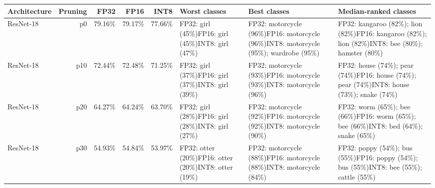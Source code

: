 \begingroup\scriptsize
\setlength{\tabcolsep}{3pt}
\begin{longtable}{p{2.8cm} r r r r p{5.0cm} p{4.2cm} p{4.2cm}}
\hline
Architecture & Pruning & FP32 & FP16 & INT8 & Worst classes & Best classes & Median-ranked classes \\
\hline\endhead
ResNet-18 & p0 & 79.16\% & 79.17\% & 77.66\% & FP32: girl (45\%)\newline FP16: girl (45\%)\newline INT8: girl (47\%) & FP32: motorcycle (96\%)\newline FP16: motorcycle (96\%)\newline INT8: motorcycle (95\%); wardrobe (95\%) & FP32: kangaroo (82\%); lion (82\%)\newline FP16: kangaroo (82\%); lion (82\%)\newline INT8: bee (80\%); hamster (80\%) \\ \hline
ResNet-18 & p10 & 72.44\% & 72.48\% & 71.25\% & FP32: girl (37\%)\newline FP16: girl (37\%)\newline INT8: girl (39\%) & FP32: motorcycle (93\%)\newline FP16: motorcycle (93\%)\newline INT8: motorcycle (96\%) & FP32: house (74\%); pear (74\%)\newline FP16: house (74\%); pear (74\%)\newline INT8: house (73\%); snake (74\%) \\ \hline
ResNet-18 & p20 & 64.27\% & 64.24\% & 63.70\% & FP32: girl (28\%)\newline FP16: girl (28\%)\newline INT8: girl (27\%) & FP32: motorcycle (92\%)\newline FP16: motorcycle (92\%)\newline INT8: motorcycle (90\%) & FP32: worm (65\%); bee (66\%)\newline FP16: worm (65\%); bee (66\%)\newline INT8: bed (64\%); snake (65\%) \\ \hline
ResNet-18 & p30 & 54.93\% & 54.84\% & 53.97\% & FP32: otter (20\%)\newline FP16: otter (20\%)\newline INT8: otter (19\%) & FP32: motorcycle (88\%)\newline FP16: motorcycle (88\%)\newline INT8: motorcycle (84\%) & FP32: poppy (54\%); bus (55\%)\newline FP16: poppy (54\%); bus (55\%)\newline INT8: bee (55\%); cattle (55\%) \\ \hline

\end{longtable}
